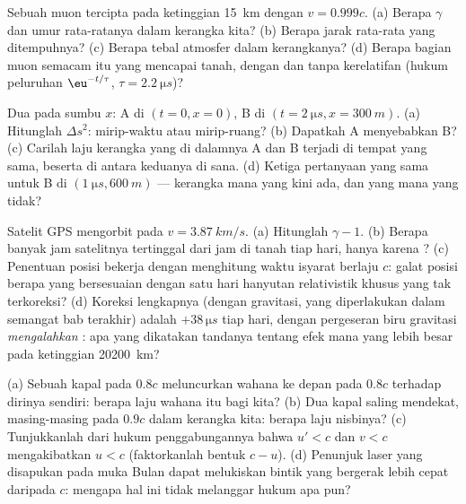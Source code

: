 \begin{exercise}[$\star$]\label{exo:b3:relativistic-kinematics:3}
Sebuah muon tercipta pada ketinggian \qty{15}{km} dengan $v = 0.999c$.
(a) Berapa $\gamma$ dan umur rata-ratanya dalam kerangka kita? (b) Berapa
jarak rata-rata yang ditempuhnya? (c) Berapa tebal atmosfer dalam
kerangkanya? (d) Berapa bagian muon semacam itu yang mencapai tanah,
dengan dan tanpa kerelatifan (hukum peluruhan $\eu^{-t/\tau}$,
$\tau = \qty{2.2}{\micro s}$)?
\end{exercise}

\begin{exercise}[$\star$]\label{exo:b3:relativistic-kinematics:4}
Dua  pada sumbu $x$: A di $(t = 0, x = 0)$, B di $(t =
\qty{2}{\micro s}, x = \qty{300}{m})$. (a) Hitunglah $\Delta s^2$:
mirip-waktu atau mirip-ruang? (b) Dapatkah A menyebabkan B? (c)
Carilah laju kerangka yang di dalamnya A dan B terjadi di tempat yang
sama, beserta  di antara keduanya di sana. (d) Ketiga
pertanyaan yang sama untuk B di
$(\qty{1}{\micro s}, \qty{600}{m})$ --- kerangka mana yang kini ada, dan
yang mana yang tidak?
\end{exercise}

\begin{exercise}[$\star\star$]\label{exo:b3:relativistic-kinematics:5}
Satelit GPS mengorbit pada $v = \qty{3.87}{km/s}$. (a) Hitunglah $\gamma -
1$. (b) Berapa banyak jam satelitnya tertinggal dari jam di tanah tiap
hari, hanya karena ? (c) Penentuan posisi bekerja dengan
menghitung waktu isyarat berlaju $c$: galat posisi berapa yang
bersesuaian dengan satu hari hanyutan relativistik khusus yang tak
terkoreksi? (d) Koreksi lengkapnya (dengan gravitasi, yang diperlakukan
dalam semangat bab terakhir) adalah $+38\,\unit{\micro s}$ tiap
hari, dengan pergeseran biru gravitasi \emph{mengalahkan} : apa yang dikatakan tandanya tentang efek mana yang lebih besar
pada ketinggian \qty{20200}{km}?
\end{exercise}

\begin{exercise}[$\star\star$]\label{exo:b3:relativistic-kinematics:6}
(a) Sebuah kapal pada $0.8c$ meluncurkan wahana ke depan pada $0.8c$
terhadap dirinya sendiri: berapa laju wahana itu bagi kita? (b) Dua
kapal saling mendekat, masing-masing pada $0.9c$ dalam kerangka kita:
berapa laju nisbinya? (c) Tunjukkanlah dari hukum penggabungannya bahwa
$u' < c$ dan $v < c$ mengakibatkan $u < c$ (faktorkanlah bentuk
$c - u$). (d) Penunjuk laser yang disapukan pada muka Bulan dapat
melukiskan bintik yang bergerak lebih cepat daripada $c$: mengapa hal
ini tidak melanggar hukum apa pun?
\end{exercise}

